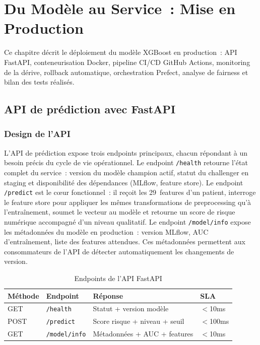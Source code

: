 \chapter{Du Modèle au Service~: Mise en Production}
\label{chap:production}

\begin{infobox}
Ce chapitre décrit le déploiement du modèle XGBoost en production~: API FastAPI,
conteneurisation Docker, pipeline CI/CD GitHub Actions, monitoring de la dérive,
rollback automatique, orchestration Prefect, analyse de fairness et bilan des
tests réalisés.
\end{infobox}

\section{API de prédiction avec FastAPI}

\subsection{Design de l'API}

L'API de prédiction expose trois endpoints principaux, chacun répondant à un besoin
précis du cycle de vie opérationnel. Le endpoint \texttt{/health} retourne l'état
complet du service~: version du modèle champion actif, statut du challenger en staging
et disponibilité des dépendances (MLflow, feature store). Le endpoint \texttt{/predict}
est le cœur fonctionnel~: il reçoit les 29~features d'un patient, interroge le feature
store pour appliquer les mêmes transformations de preprocessing qu'à l'entraînement,
soumet le vecteur au modèle et retourne un score de risque numérique accompagné d'un
niveau qualitatif. Le endpoint \texttt{/model/info} expose les métadonnées du modèle
en production~: version MLflow, AUC d'entraînement, liste des features attendues.
Ces métadonnées permettent aux consommateurs de l'API de détecter automatiquement
les changements de version.

\begin{table}[htbp]
\centering
\caption{Endpoints de l'API FastAPI}
\label{tab:api}
\begin{tabular}{@{}llll@{}}
\toprule
\textbf{Méthode} & \textbf{Endpoint} & \textbf{Réponse} & \textbf{SLA} \\
\midrule
GET  & \texttt{/health}      & Statut + version modèle      & $<$10ms \\
POST & \texttt{/predict}     & Score risque + niveau + seuil & $<$100ms \\
GET  & \texttt{/model/info}  & Métadonnées + AUC + features  & $<$10ms \\
\bottomrule
\end{tabular}
\end{table}


